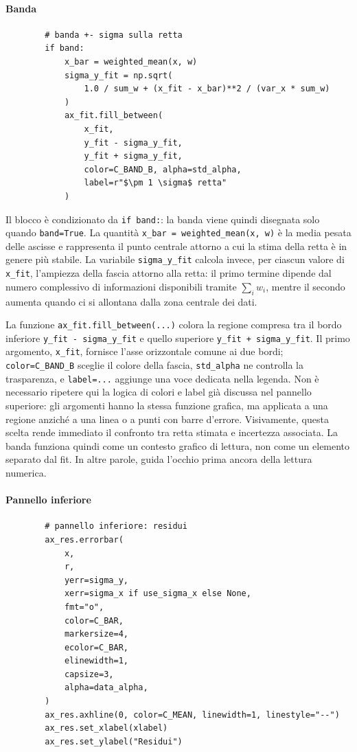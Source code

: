 \newpage
\paragraph{Banda}
\begin{verbatim}
        # banda +- sigma sulla retta
        if band:
            x_bar = weighted_mean(x, w)
            sigma_y_fit = np.sqrt(
                1.0 / sum_w + (x_fit - x_bar)**2 / (var_x * sum_w)
            )
            ax_fit.fill_between(
                x_fit,
                y_fit - sigma_y_fit,
                y_fit + sigma_y_fit,
                color=C_BAND_B, alpha=std_alpha,
                label=r"$\pm 1 \sigma$ retta"
            )
\end{verbatim}

Il blocco è condizionato da \texttt{if band:}: la banda viene quindi disegnata solo quando \texttt{band=True}. La quantità \texttt{x\_bar = weighted\_mean(x, w)} è la media pesata delle ascisse e rappresenta il punto centrale attorno a cui la stima della retta è in genere più stabile. La variabile \texttt{sigma\_y\_fit} calcola invece, per ciascun valore di \texttt{x\_fit}, l'ampiezza della fascia attorno alla retta: il primo termine dipende dal numero complessivo di informazioni disponibili tramite \(\sum_i w_i\), mentre il secondo aumenta quando ci si allontana dalla zona centrale dei dati.

La funzione \texttt{ax\_fit.fill\_between(...)} colora la regione compresa tra il bordo inferiore \texttt{y\_fit - sigma\_y\_fit} e quello superiore \texttt{y\_fit + sigma\_y\_fit}. Il primo argomento, \texttt{x\_fit}, fornisce l'asse orizzontale comune ai due bordi; \texttt{color=C\_BAND\_B} sceglie il colore della fascia, \texttt{std\_alpha} ne controlla la trasparenza, e \texttt{label=...} aggiunge una voce dedicata nella legenda. Non è necessario ripetere qui la logica di colori e label già discussa nel pannello superiore: gli argomenti hanno la stessa funzione grafica, ma applicata a una regione anziché a una linea o a punti con barre d'errore. Visivamente, questa scelta rende immediato il confronto tra retta stimata e incertezza associata. La banda funziona quindi come un contesto grafico di lettura, non come un elemento separato dal fit. In altre parole, guida l'occhio prima ancora della lettura numerica.

\paragraph{Pannello inferiore}
\begin{verbatim}
        # pannello inferiore: residui
        ax_res.errorbar(
            x,
            r,
            yerr=sigma_y,
            xerr=sigma_x if use_sigma_x else None,
            fmt="o",
            color=C_BAR,
            markersize=4,
            ecolor=C_BAR,
            elinewidth=1,
            capsize=3,
            alpha=data_alpha,
        )
        ax_res.axhline(0, color=C_MEAN, linewidth=1, linestyle="--")
        ax_res.set_xlabel(xlabel)
        ax_res.set_ylabel("Residui")
\end{verbatim}

